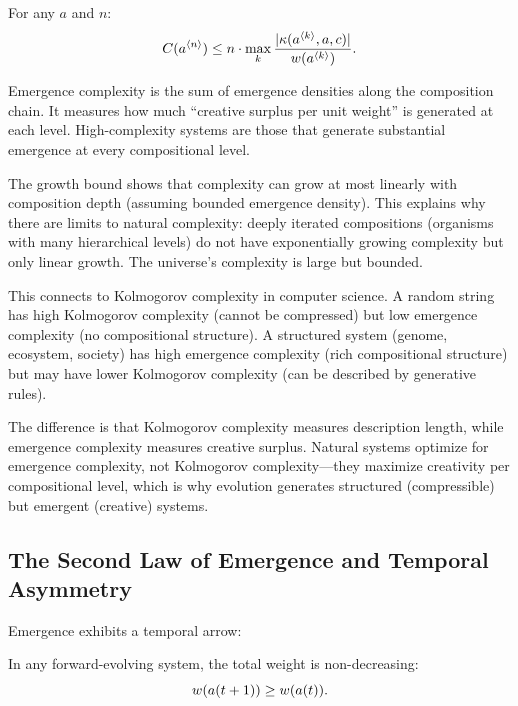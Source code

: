 \begin{theorem}
\label{thm:complexity-growth}
For any $a$ and $n$:
\[
  C(a^{\langle n \rangle}) \leq n \cdot \max_{k} \frac{|\kappa(a^{\langle k \rangle}, a, c)|}{w(a^{\langle k \rangle})}.
\]
\end{theorem}

\begin{interpretation}
Emergence complexity is the sum of emergence densities along the composition
chain. It measures how much ``creative surplus per unit weight'' is generated
at each level. High-complexity systems are those that generate substantial
emergence at every compositional level.

The growth bound shows that complexity can grow at most linearly with composition
depth (assuming bounded emergence density). This explains why there are limits
to natural complexity: deeply iterated compositions (organisms with many
hierarchical levels) do not have exponentially growing complexity but only
linear growth. The universe's complexity is large but bounded.

This connects to Kolmogorov complexity in computer science. A random string has
high Kolmogorov complexity (cannot be compressed) but low emergence complexity
(no compositional structure). A structured system (genome, ecosystem, society)
has high emergence complexity (rich compositional structure) but may have lower
Kolmogorov complexity (can be described by generative rules).

The difference is that Kolmogorov complexity measures description length, while
emergence complexity measures creative surplus. Natural systems optimize for
emergence complexity, not Kolmogorov complexity---they maximize creativity per
compositional level, which is why evolution generates structured (compressible)
but emergent (creative) systems.
\end{interpretation}

\subsection{The Second Law of Emergence and Temporal Asymmetry}

Emergence exhibits a temporal arrow:

\begin{theorem}
\label{thm:second-law-emergence}
In any forward-evolving system, the total weight is non-decreasing:
\[
  w(a(t+1)) \geq w(a(t)).
\]
\end{theorem}

